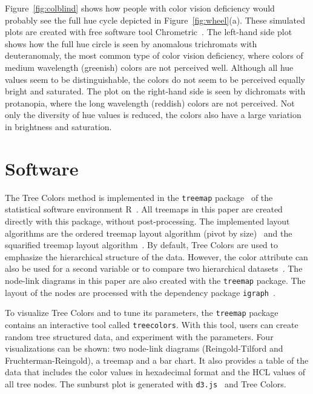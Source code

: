 \documentclass[journal]{vgtc}                %
\begin{document}
Figure~\ref{fig:colblind} shows how people with color vision deficiency would probably see the full hue cycle depicted in Figure~\ref{fig:wheel}(a). These simulated plots are created with free software tool Chrometric~\cite{chrometric}. The left-hand side plot shows how the full hue circle is seen by anomalous trichromats with deuteranomaly, the most common type of color vision deficiency, where colors of medium wavelength (greenish) colors are not perceived well. Although all hue values seem to be distinguishable, the colors do not seem to be perceived equally bright and saturated. The plot on the right-hand side is seen by dichromats with protanopia, where the long wavelength (reddish) colors are not perceived. Not only the diversity of hue values is reduced, the colors also have a large variation in brightness and saturation.




\section{Software}

The Tree Colors method is implemented in the \texttt{treemap} package~\cite{treemap} of the statistical software environment R~\cite{r2013}. All treemaps in this paper are created directly with this package, without post-processing. The implemented layout algorithms are the ordered treemap layout algorithm (pivot by size)~\cite{Bederson2002} and the squarified treemap layout algorithm~\cite{bruls99}. By default, Tree Colors are used to emphasize the hierarchical structure of the data. However, the color attribute can also be used for a second variable or to compare two hierarchical datasets~\cite{tennekes2011b}. The node-link diagrams in this paper are also created with the \texttt{treemap} package. The layout of the nodes are processed with the dependency package \texttt{igraph}~\cite{igraph}.

To visualize Tree Colors and to tune its parameters, the \texttt{treemap} package contains an interactive tool called \texttt{treecolors}. With this tool, users can create random tree structured data, and experiment with the parameters. Four visualizations can be shown: two node-link diagrams (Reingold-Tilford and Fruchterman-Reingold), a treemap and a bar chart. It also provides a table of the data that includes the color values in hexadecimal format and the HCL values of all tree nodes. The sunburst plot is generated with \texttt{d3.js}~\cite{bostock2012d3} and Tree Colors.
\end{document}

